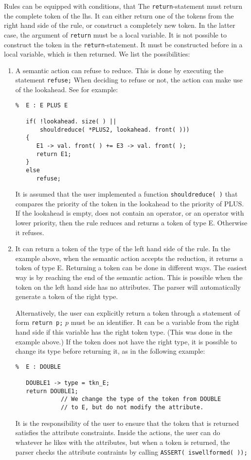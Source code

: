 \documentclass{article}
\begin{document}
Rules can be equipped with conditions, that 
The \verb+return+-statement must return the complete token
of the lhs. It can either return one of the tokens from
the right hand side of the rule, or construct a completely
new token. In the latter case, the argument of \verb+return+ 
must be a local variable. It is not possible to construct
the token in the \verb+return+-statement. It must be constructed
before in a local variable, which is then returned. 
We list the possibilities: 
\begin{enumerate}
\item
   A semantic action can refuse to reduce. This is done by executing 
   the statement \verb+refuse;+ 
   When deciding to refuse or not, the action can make use of the lookahead.
   See for example:
\begin{verbatim} 
%  E : E PLUS E

   if( !lookahead. size( ) || 
       shouldreduce( *PLUS2, lookahead. front( )))
   {
      E1 -> val. front( ) += E3 -> val. front( );
      return E1;
   }
   else
      refuse;
\end{verbatim}
   It is assumed that the user implemented a function 
   \verb+shouldreduce( )+ that compares the priority of the token 
   in the lookahead to the priority of PLUS. If the lookahead is empty,   
   does not contain an operator, or an operator with lower priority, then
   the rule reduces and returns a token of type E. Otherwise it refuses.

\item
   It can return a token of the type of the left hand side of the rule.
   In the example above, when the semantic action accepts the reduction, 
   it returns a token of type E.
   Returning a token can be done in different ways. The easiest way
   is by reaching the end of the semantic action. 
   This is possible when the token on the left hand side has no
   attributes. 
   The parser will automatically generate a token of the right type. 
   
   \noindent
   Alternatively, the user can explicitly return a token through
   a statement of form \verb+return p;+ 
   $ p $ must be an identifier. It can be a variable from 
   the right hand side if this variable has the right token type.
   (This was done in the example above.)
   If the token does not have the right type, it is possible to change
   its type before returning it, as in the following example:
\begin{verbatim}
%  E : DOUBLE

   DOUBLE1 -> type = tkn_E;
   return DOUBLE1;     
             // We change the type of the token from DOUBLE 
             // to E, but do not modify the attribute. 
\end{verbatim}
   It is the responsibility of the user to ensure that the
   token that is returned satisfies the attribute constraints. Inside
   the actions, the user can do whatever he likes with the attributes,
   but when a token is returned, the parser
   checks the attribute contraints by calling 
   \verb+ASSERT( iswellformed( ));+


\end{enumerate}
\end{document}
